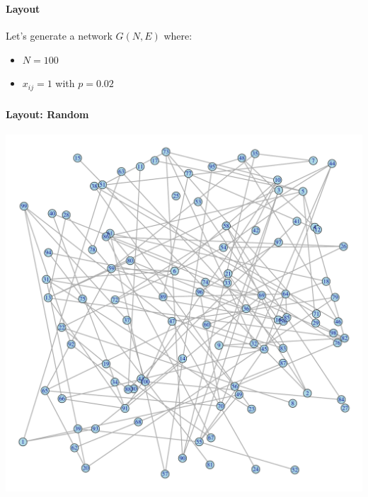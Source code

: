 \documentclass[8pt]{beamer}
\begin{document}

\begin{frame}
\frametitle{\insertsection}
\framesubtitle{Layout}

Let's generate a network $G(N, E)$ where:
\begin{itemize}
\item $N=100$
\item $x_{ij} = 1$ with $p=0.02$
\end{itemize}
 
\end{frame}


\begin{frame}
\frametitle{\insertsection}
\framesubtitle{Layout: Random}

\centering
\includegraphics[height=0.85\textheight]{random}

\end{frame}

\end{document}

